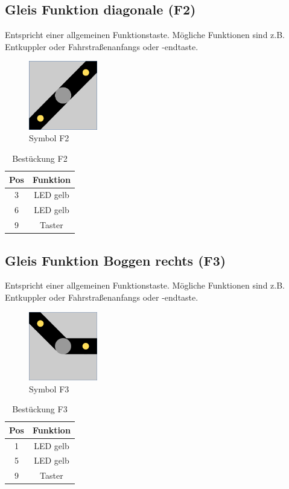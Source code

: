 \documentclass[10pt,a4paper]{article}
\begin{document}
\subsection{Gleis Funktion diagonale (F2)}
Entspricht einer allgemeinen Funktionstaste. Mögliche Funktionen sind z.B. Entkuppler oder Fahrstraßenanfangs oder -endtaste.
\begin{figure}[hbtp]
\centering
\includegraphics[width=3cm]{../folien/f2.png}
\caption{Symbol F2}
\end{figure}
\begin{table}[h!]
\centering
\begin{tabular}{c|c}
\textbf{Pos} & \textbf{Funktion} \\ \hline
3 & LED gelb \\
6 & LED gelb \\
9 & Taster
\end{tabular}
\caption{Bestückung F2}
\end{table}

\newpage
\subsection{Gleis Funktion Boggen rechts (F3)}
Entspricht einer allgemeinen Funktionstaste. Mögliche Funktionen sind z.B. Entkuppler oder Fahrstraßenanfangs oder -endtaste.
\begin{figure}[hbtp]
\centering
\includegraphics[width=3cm]{../folien/f3.png}
\caption{Symbol F3}
\end{figure}
\begin{table}[h!]
\centering
\begin{tabular}{c|c}
\textbf{Pos} & \textbf{Funktion} \\ \hline
1 & LED gelb \\
5 & LED gelb \\
9 & Taster
\end{tabular}
\caption{Bestückung F3}
\end{table}
 
\end{document}
